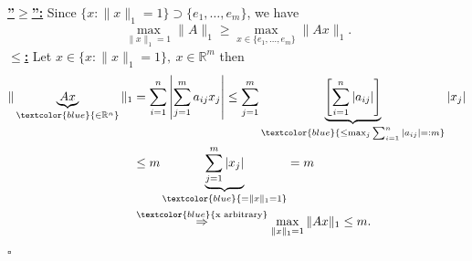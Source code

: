 {\color{solution}
\textbf{\underline{''$\geq$'':}} Since $\{x:\|x\|_1=1\}\supset \{e_1,\dots,e_m\}$, we have 
$$
\max_{\|x\|_1=1}\|A\|_1\geq\max_{x\in\{e_1,\dots,e_m\}}\|Ax\|_1.
$$
\textbf{\underline{$\leq$:}} Let $x\in\{x:\|x\|_1=1\},~x\in\mathbb{R}^m$ then
\begin{align*}
\|\underbrace{Ax}_{\textcolor{blue}{\in\mathbb{R}^n}}\|_1&=\sum_{i=1}^{n}\left|\sum_{j=1}^{m}a_{ij}x_j\right|\leq\sum_{j=1}^{m}\underbrace{\left[\sum_{i=1}^{n}|a_{ij}|\right]}_{\textcolor{blue}{\leq\max_j\sum_{i=1}^{n}|a_{ij}|=:m}}|x_j|\\
&\leq m\underbrace{\sum_{j=1}^{m}|x_j|}_{\textcolor{blue}{=\|x\|_1=1}}=m\\
&\stackrel{\textcolor{blue}{\text{x arbitrary}}}{\Rightarrow} \max_{\|x\|_1=1} \|Ax\|_1 \leq m.
\end{align*}
\begin{flushright}
	$\square$
\end{flushright}
}